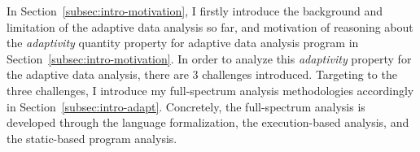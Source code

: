 In Section~\ref{subsec:intro-motivation},
I firstly introduce the background and limitation of the 
adaptive data analysis so far, 
and motivation of reasoning about the \emph{adaptivity} quantity property 
for adaptive data analysis program in Section~\ref{subsec:intro-motivation}.
In order to analyze this \emph{adaptivity} property for the adaptive data analysis, there are 3 challenges
introduced.
Targeting to the three challenges, I introduce my full-spectrum analysis methodologies accordingly in Section~\ref{subsec:intro-adapt}.
Concretely, the full-spectrum analysis is developed through the language formalization,
the execution-based analysis, and the static-based program analysis.
